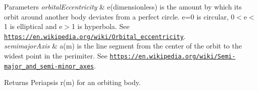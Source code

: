 \begin{DoxyParams}{Parameters}
{\em orbital\+Eccentricity} & e(dimensionless) is the amount by which its orbit around another body deviates from a perfect circle. e=0 is circular, 0$<$e$<$1 is elliptical and e$>$1 is hyperbola. See \href{https://en.wikipedia.org/wiki/Orbital_eccentricity}{\tt https\+://en.\+wikipedia.\+org/wiki/\+Orbital\+\_\+eccentricity}. \\
\hline
{\em semimajor\+Axis} & a(m) is the line segment from the center of the orbit to the widest point in the perimiter. See \href{https://en.wikipedia.org/wiki/Semi-major_and_semi-minor_axes}{\tt https\+://en.\+wikipedia.\+org/wiki/\+Semi-\/major\+\_\+and\+\_\+semi-\/minor\+\_\+axes}. \\
\hline
\end{DoxyParams}
\begin{DoxyReturn}{Returns}
Periapsis r(m) for an orbiting body. 
\end{DoxyReturn}

